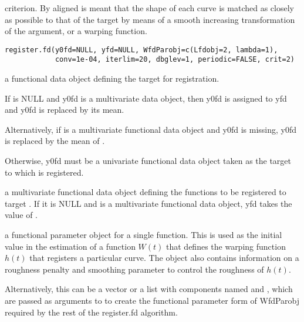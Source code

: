 \documentclass{article}
\begin{document}
\begin{Description}\relax
criterion.  By aligned is meant that the shape of each curve is matched
as closely as possible to that of the target by means of a smooth
increasing transformation of the argument, or a warping function.
\end{Description}
\begin{Usage}
\begin{verbatim}
register.fd(y0fd=NULL, yfd=NULL, WfdParobj=c(Lfdobj=2, lambda=1),
            conv=1e-04, iterlim=20, dbglev=1, periodic=FALSE, crit=2)
\end{verbatim}
\end{Usage}
\begin{Arguments}
\begin{ldescription}
\item[\code{y0fd}] a functional data object defining the target for registration.

If  is NULL and y0fd is a multivariate data object, then
y0fd is assigned to yfd and y0fd is replaced by its mean.

Alternatively, if  is a multivariate functional data
object and y0fd is missing, y0fd is replaced by the mean of
.  

Otherwise, y0fd must be a univariate functional data object taken as
the target to which  is registered.  

\item[\code{yfd}] a multivariate functional data object defining the functions to be
registered to target .  If it is NULL and  is
a multivariate functional data object, yfd takes the value of 
.  

\item[\code{WfdParobj}] a functional parameter object for a single function.  This is used
as the initial value in the estimation of a function $W(t)$ that
defines the warping function $h(t)$ that registers a particular
curve. The object also contains information on a roughness penalty 
and smoothing parameter to control the roughness of $h(t)$.

Alternatively, this can be a vector or a list with components named
 and , which are passed as arguments to
 to create the functional parameter form of WfdParobj
required by the rest of the register.fd algorithm.


\end{ldescription}
\end{Arguments}
\end{document}
